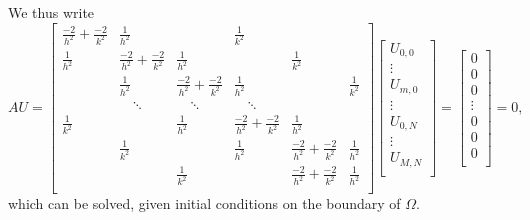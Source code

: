 \begin{figure}[htb]
    \centering
    
    \label{ex3:fig:flat_stencil}
\end{figure}
We thus write
\begin{equation*}
    \renewcommand{\arraystretch}{2.5} %
    AU = 
    \begin{bmatrix}
        \frac{-2}{h^2} + \frac{-2}{k^2} & \frac{1}{h^2} &&\frac{1}{k^2}\\
        \frac{1}{h^2} & \frac{-2}{h^2} + \frac{-2}{k^2}   & \frac{1}{h^2} &&\frac{1}{k^2}\\
        & \frac{1}{h^2} & \frac{-2}{h^2} + \frac{-2}{k^2}   & \frac{1}{h^2} &&\frac{1}{k^2}\\
        &  \quad \ddots & \quad \ddots  & \quad \ddots \\
        \frac{1}{k^2} && \frac{1}{h^2} & \frac{-2}{h^2} + \frac{-2}{k^2} & \frac{1}{h^2} \\
        & \frac{1}{k^2} && \frac{1}{h^2} & \frac{-2}{h^2} + \frac{-2}{k^2}   & \frac{1}{h^2} \\
        && \frac{1}{k^2} && \frac{-2}{h^2} + \frac{-2}{k^2} & \frac{1}{h^2} \\
    \end{bmatrix}
    \begin{bmatrix}
    U_{0,0} \\ \vdots \\ U_{m,0} \\ \vdots \\ U_{0,N} \\ \vdots \\ U_{M,N} \\
    \end{bmatrix}
    =
    \begin{bmatrix}
    0 \\ 0 \\ 0 \\ \vdots \\ 0 \\ 0 \\ 0 \\
    \end{bmatrix}
    = 0,
    \label{ex3:eq:solution_equation}
\end{equation*}
which can be solved, given initial conditions on the boundary of $\Omega$.
